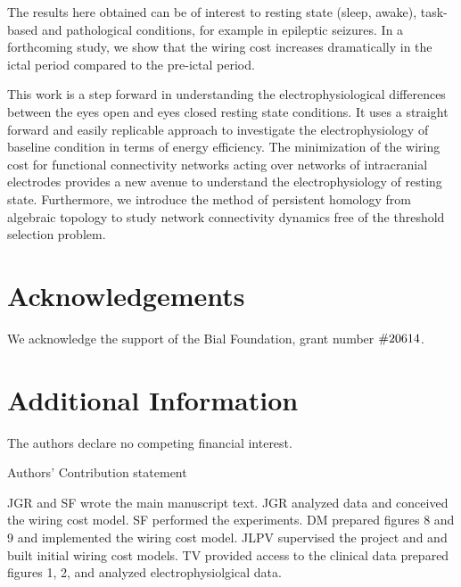 \documentclass[11pt, onecolumn]{article}
\begin{document}
The results here obtained can be of interest to resting state (sleep, awake), task-based and pathological conditions, for example in epileptic seizures. In a forthcoming study, we show that the wiring cost increases dramatically in the ictal period compared to the pre-ictal period.   

This work is a step forward in understanding the electrophysiological differences between the eyes open and eyes closed resting state conditions. It uses a straight forward and easily replicable approach to investigate the electrophysiology of baseline condition in terms of energy efficiency. The minimization of the wiring cost for functional connectivity networks acting over networks of intracranial electrodes provides a new avenue to understand the electrophysiology of resting state. Furthermore, we introduce the method of persistent homology from algebraic topology to study network connectivity dynamics free of the threshold selection problem.


\section*{Acknowledgements}
We acknowledge the support of the Bial Foundation, grant number  $\#206\/14$.
\section*{Additional Information}
The authors declare no competing financial interest.

%




Authors' Contribution statement

JGR and SF wrote the main manuscript text. JGR analyzed data and conceived the wiring cost model. SF performed the experiments. DM prepared figures 8 and 9 and implemented the wiring cost model. JLPV supervised the project and and built initial wiring cost models. TV provided access to the clinical data prepared figures 1, 2, and analyzed electrophysiolgical data.
\end{document}
